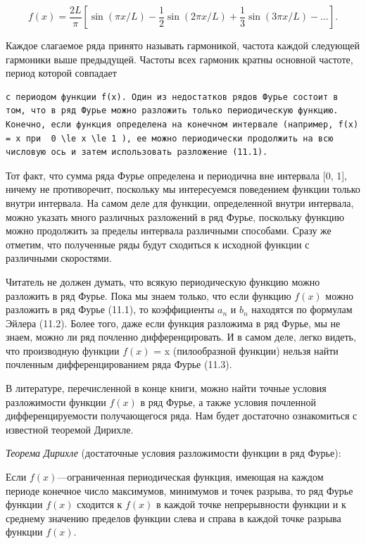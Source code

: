\documentclass[
  ukrainian,
]{article}
\begin{document}
\[
f(x) = \frac{2L}{\pi} \left[ \sin(\pi x/L) - \frac{1}{2} \sin(2\pi x/L) + \frac{1}{3} \sin(3\pi x/L) - \dots \right].
\]

Каждое слагаемое ряда принято называть гармоникой, частота каждой
следующей гармоники выше предыдущей. Частоты всех гармоник кратны
основной частоте, период которой совпадает

\begin{verbatim}
с периодом функции f(x). Один из недостатков рядов Фурье состоит в том, что в ряд Фурье можно разложить только периодическую функцию. Конечно, если функция определена на конечном интервале (например, f(x) = x при  0 \le x \le 1 ), ее можно периодически продолжить на всю числовую ось и затем использовать разложение (11.1).
\end{verbatim}

Тот факт, что сумма ряда Фурье определена и периодична вне интервала
{[}0, 1{]}, ничему не противоречит, поскольку мы интересуемся поведением
функции только внутри интервала. На самом деле для функции, определенной
внутри интервала, можно указать много различных разложений в ряд Фурье,
поскольку функцию можно продолжить за пределы интервала различными
способами. Сразу же отметим, что полученные ряды будут сходиться к
исходной функции с различными скоростями.

Читатель не должен думать, что всякую периодическую функцию можно
разложить в ряд Фурье. Пока мы знаем только, что если функцию \(f(x)\)
можно разложить в ряд Фурье (11.1), то коэффициенты \(a_n\) и \(b_n\)
находятся по формулам Эйлера (11.2). Более того, даже если функция
разложима в ряд Фурье, мы не знаем, можно ли ряд почленно
дифференцировать. И в самом деле, легко видеть, что производную функции
\(f(x)\) = x (пилообразной функции) нельзя найти почленным
дифференцированием ряда Фурье (11.3).

В литературе, перечисленной в конце книги, можно найти точные условия
разложимости функции \(f(x)\) в ряд Фурье, а также условия почленной
дифференцируемости получающегося ряда. Нам будет достаточно ознакомиться
с известной теоремой Дирихле.

\emph{Теорема Дирихле} (достаточные условия разложимости функции в ряд
Фурье):

Если \(f(x)\)---ограниченная периодическая функция, имеющая на каждом
периоде конечное число максимумов, минимумов и точек разрыва, то ряд
Фурье функции \(f(x)\) сходится к \(f(x)\) в каждой точке непрерывности
функции и к среднему значению пределов функции слева и справа в каждой
точке разрыва функции \(f(x)\).
\end{document}
